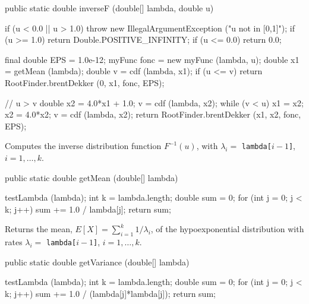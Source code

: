 \begin{code}

   public static double inverseF (double[] lambda, double u)\begin{hide} {
      if (u < 0.0 || u > 1.0)
          throw new IllegalArgumentException ("u not in [0,1]");
      if (u >= 1.0)
          return Double.POSITIVE_INFINITY;
      if (u <= 0.0)
          return 0.0;

      final double EPS = 1.0e-12;
      myFunc fonc = new myFunc (lambda, u);
      double x1 = getMean (lambda);
      double v = cdf (lambda, x1);
      if (u <= v)
         return RootFinder.brentDekker (0, x1, fonc, EPS);

      // u > v
      double x2 = 4.0*x1 + 1.0;
      v = cdf (lambda, x2);
      while (v < u) {
         x1 = x2;
         x2 = 4.0*x2;
         v = cdf (lambda, x2);
      }
      return RootFinder.brentDekker (x1, x2, fonc, EPS);
   }\end{hide}
\end{code}
  \begin{tabb}
 Computes the inverse distribution function $F^{-1}(u)$,
with $\lambda_i = $ \texttt{lambda[$i-1$]}, $i = 1,\ldots,k$.
\end{tabb}
\begin{htmlonly}
\end{htmlonly}
\begin{code}

   public static double getMean (double[] lambda)\begin{hide} {
      testLambda (lambda);
      int k = lambda.length;
      double sum = 0;
      for (int j = 0; j < k; j++)
         sum += 1.0 / lambda[j];
      return sum;
   }\end{hide}
\end{code}
\begin{tabb} Returns the mean, $E[X] = \sum_{i=1}^k 1/\lambda_i$,
   of the hypoexponential distribution with rates $\lambda_i = $
\texttt{lambda[$i-1$]}, $i = 1,\ldots,k$.
\end{tabb}
\begin{htmlonly}
\end{htmlonly}
\begin{code}

   public static double getVariance (double[] lambda)\begin{hide} {
      testLambda (lambda);
      int k = lambda.length;
      double sum = 0;
      for (int j = 0; j < k; j++)
         sum += 1.0 / (lambda[j]*lambda[j]);
      return sum;
   }\end{hide}
\end{code}
